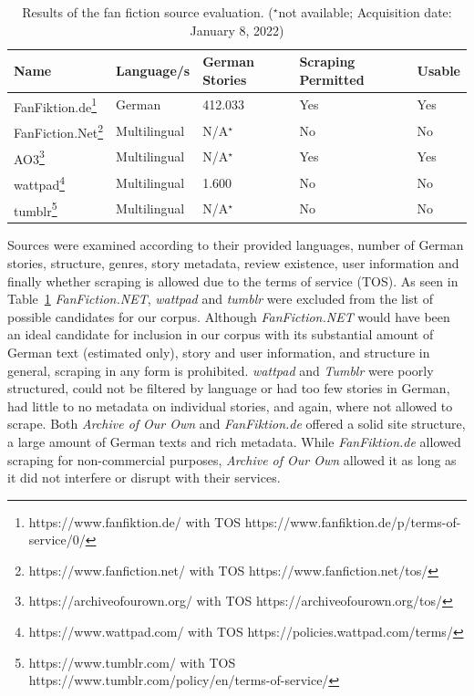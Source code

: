 \begin{table}[htp]
    \centering
    \begin{tabular}{p{3.4cm}p{2.5cm}p{2cm}p{2cm}p{2cm}} %
        \toprule
        \textbf{Name}                                                                                               & \textbf{Language/s} & \textbf{German Stories} & \textbf{Scraping Permitted} & \textbf{Usable} \\
        \midrule
        FanFiktion.de\footnote{https://www.fanfiktion.de/ with TOS https://www.fanfiktion.de/p/terms-of-service/0/} & German & 412.033 & Yes & Yes \\
        FanFiction.Net\footnote{https://www.fanfiction.net/ with TOS https://www.fanfiction.net/tos/} & Multilingual & N/A$^\star$ & No & No \\
        AO3\footnote{https://archiveofourown.org/ with TOS https://archiveofourown.org/tos/} & Multilingual & N/A$^\star$ & Yes & Yes \\
        wattpad\footnote{https://www.wattpad.com/ with TOS https://policies.wattpad.com/terms/} & Multilingual & 1.600 & No & No \\
        tumblr\footnote{https://www.tumblr.com/ with TOS https://www.tumblr.com/policy/en/terms-of-service/} & Multilingual & N/A$^\star$ & No & No \\
        \bottomrule
    \end{tabular}
    \caption[Results of the fan fiction source evaluation.]{Results of the fan fiction source evaluation. (${}^\star$not available; Acquisition date: January 8, 2022)}
    \label{tab:evaluation-results}
\end{table}

Sources were examined according to their provided languages, number of German stories, structure, genres, story metadata, review existence, user information and finally whether scraping is allowed due to the terms of service (TOS).
As seen in Table~\ref{tab:evaluation-results} \emph{FanFiction.NET}, \emph{wattpad} and \emph{tumblr} were excluded from the list of possible candidates for our corpus.
Although \emph{FanFiction.NET} would have been an ideal candidate for inclusion in our corpus with its substantial amount of German text (estimated only), story and user information, and structure in general, scraping in any form is prohibited.
\emph{wattpad} and \emph{Tumblr} were poorly structured, could not be filtered by language or had too few stories in German, had little to no metadata on individual stories, and again, where not allowed to scrape.
Both \emph{Archive of Our Own} and \emph{FanFiktion.de} offered a solid site structure, a large amount of German texts and rich metadata.
While \emph{FanFiktion.de} allowed scraping for non-commercial purposes, \emph{Archive of Our Own} allowed it as long as it did not interfere or disrupt with their services.

